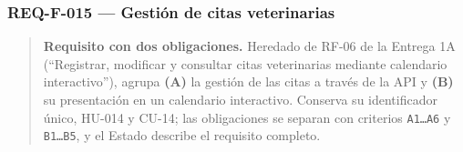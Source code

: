 \documentclass[
  spanish,
]{article}
\begin{document}
\subsubsection{REQ-F-015 --- Gestión de citas
veterinarias}\label{req-f-015-gestiuxf3n-de-citas-veterinarias}

\begin{quote}
\textbf{Requisito con dos obligaciones.} Heredado de RF-06 de la Entrega
1A (``Registrar, modificar y consultar citas veterinarias mediante
calendario interactivo''), agrupa \textbf{(A)} la gestión de las citas a
través de la API y \textbf{(B)} su presentación en un calendario
interactivo. Conserva su identificador único, HU-014 y CU-14; las
obligaciones se separan con criterios \texttt{A1…A6} y \texttt{B1…B5}, y
el Estado describe el requisito completo.
\end{quote}
\end{document}
